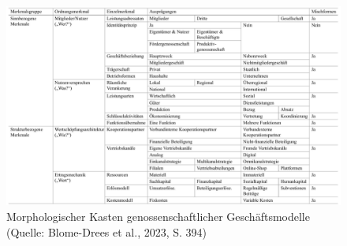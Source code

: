 \clearpage
\begin{figure}[htbp]
\centering
\includegraphics[angle=90,width=\textwidth,height=0.8\textheight,keepaspectratio]{Tabelle screenshot.png}
\caption{Morphologischer Kasten genossenschaftlicher Geschäftsmodelle (Quelle: Blome-Drees et al., 2023, S. 394)}
\label{tab:morphologischer_kasten}
\end{figure}
\clearpage
